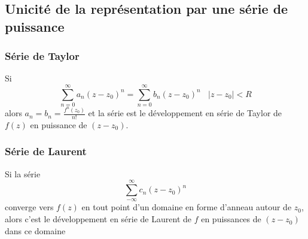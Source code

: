 	\subsection{Unicité de la représentation par une série de puissance}
		\subsubsection{Série de Taylor}
		Si 
		\begin{equation}
		\sum_{n=0}^\infty a_n(z-z_0)^n = \sum_{n=0}^\infty b_n(z-z_0)^n\ \ \ \ |z-z_0| < R
		\end{equation}
		alors $a_n = b_n = \frac{f^n(z_0)}{n!}$ et la série est le développement en série de 
		Taylor de $f(z)$ en puissance de $(z-z_0)$.
		
		\subsubsection{Série de Laurent}
		Si la série 
		\begin{equation}
		\sum_{-\infty}^\infty c_n(z-z_0)^n
		\end{equation}
		converge vers $f(z)$ en tout point d'un domaine en forme d'anneau autour de $z_0$, 
		alors c'est le développement en série de Laurent de $f$ en puissances de $(z-z_0)$ 
		dans ce domaine
		
		
